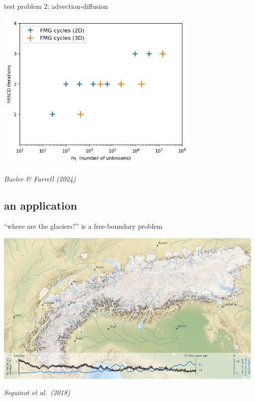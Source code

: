 \documentclass[svgnames,
               hyperref={colorlinks,citecolor=DeepPink4,linkcolor=FireBrick,urlcolor=Maroon},
               usepdftitle=false]  %
               {beamer}
\begin{document}
\begin{frame}{test problem 2: advection-diffusion}

\begin{center}
\includegraphics[width=0.75\textwidth]{figs/advdiff.png}
\end{center}

\vspace{-3mm}
\hfill \tiny \emph{Bueler \& Farrell (2024)}
\end{frame}


\subsection{an application}

\begin{frame}{``where are the glaciers?'' is a free-boundary problem}

\bigskip
\includegraphics[width=1.01\textwidth]{../talk-oxford/images/alps-seguinot2018.png}

\vspace{-2mm}
\hfill {\tiny \emph{Seguinot et al.~(2018)}}
\end{frame}
\end{document}
